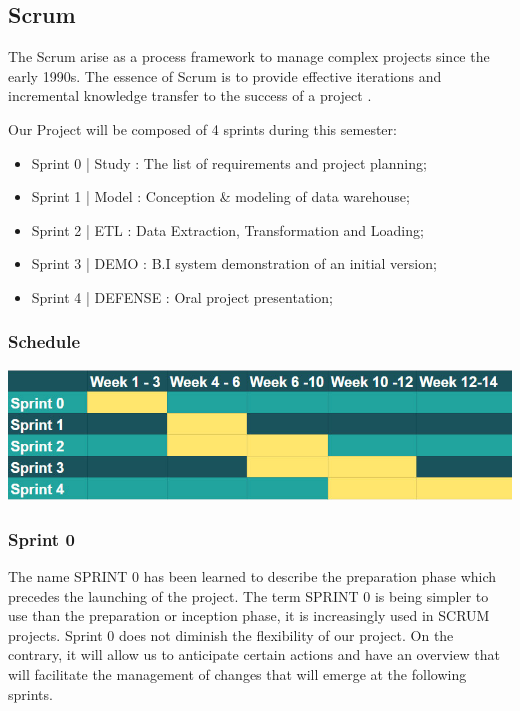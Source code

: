 \documentclass[12pt]{article}
\begin{document}
\subsection{Scrum}

 The Scrum arise as a process framework to manage complex projects since the early 1990s. The essence of Scrum is to provide effective iterations and incremental knowledge transfer to the success of a project \cite{Sutherland}. 
 
Our Project will be composed of 4 sprints during this semester:\\
\begin{itemize}
\item Sprint 0 | Study : The list of requirements and project planning;
\item Sprint 1 | Model : Conception \& modeling of data warehouse;
\item Sprint 2 | ETL : Data Extraction, Transformation and Loading;
\item Sprint 3 | DEMO : B.I system demonstration of an initial version;
\item Sprint 4 | DEFENSE : Oral project presentation;
\end{itemize}

\subsubsection{Schedule}

\includegraphics[scale = 0.5]{schedule.jpg}\\[1 cm]\cite{projectcolors}

\subsubsection{Sprint 0}

The name SPRINT 0 has been learned to describe the preparation phase which precedes the launching of the project. The term SPRINT 0 is being simpler to use than the preparation or inception phase, it is increasingly used in SCRUM projects.
Sprint 0 does not diminish the flexibility of our project. On the contrary, it will allow us to anticipate certain actions and have an overview that will facilitate the management of changes that  will emerge at the following sprints. \cite{DESTREMAU}
\end{document}
